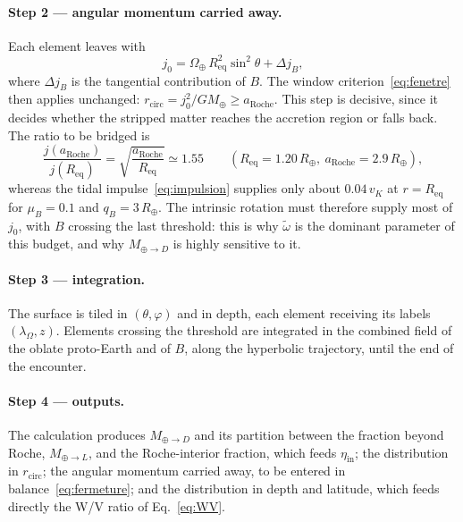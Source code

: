\documentclass[11pt,a4paper,openany]{report}
\newcommand{\Mt}{M_{\oplus}}
\newcommand{\Rt}{R_{\oplus}}
\newcommand{\Req}{R_{\mathrm{eq}}}
\newcommand{\aR}{a_{\mathrm{Roche}}}
\begin{document}
\paragraph{Step 2 --- angular momentum carried away.} Each element leaves with
\begin{equation}
j_0=\Omega_\oplus\,\Req^2\sin^2\theta+\Delta j_B,
\label{eq:j0-injection}
\end{equation}
where $\Delta j_B$ is the tangential contribution of $B$. The window
criterion~\eqref{eq:fenetre} then applies unchanged: $r_{\mathrm{circ}}=j_0^2/G\Mt\ge\aR$. This step
is decisive, since it decides whether the stripped matter reaches the accretion region or falls
back. The ratio to be bridged is
\begin{equation}
\frac{j(\aR)}{j(\Req)}=\sqrt{\frac{\aR}{\Req}}\simeq1.55
\qquad(\Req=1.20\,\Rt,\ \aR=2.9\,\Rt),
\label{eq:saut-j}
\end{equation}
whereas the tidal impulse~\eqref{eq:impulsion} supplies only about $0.04\,v_K$ at $r=\Req$ for
$\mu_B=0.1$ and $q_B=3\,\Rt$. The intrinsic rotation must therefore supply most of $j_0$, with $B$
crossing the last threshold: this is why $\tilde\omega$ is the dominant parameter of this budget,
and why $M_{\oplus\to D}$ is highly sensitive to it.

\paragraph{Step 3 --- integration.} The surface is tiled in $(\theta,\varphi)$ and in depth, each
element receiving its labels $(\lambda_\Omega,z)$. Elements crossing the threshold are integrated
in the combined field of the oblate proto-Earth and of $B$, along the hyperbolic trajectory, until
the end of the encounter.

\paragraph{Step 4 --- outputs.} The calculation produces $M_{\oplus\to D}$ and its partition between
the fraction beyond Roche, $M_{\oplus\to L}$, and the Roche-interior fraction, which feeds
$\eta_{\mathrm{in}}$; the distribution in $r_{\mathrm{circ}}$; the angular momentum carried away, to
be entered in balance~\eqref{eq:fermeture}; and the distribution in depth and latitude, which feeds
directly the W/V ratio of Eq.~\eqref{eq:WV}.
\end{document}
